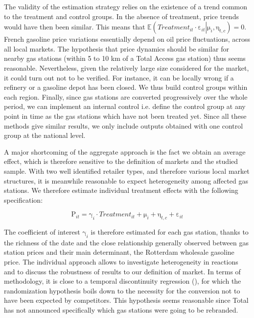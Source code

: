 \documentclass[english]{article}
\begin{document}
The validity of the estimation strategy relies on the existence of a trend common to the treatment and control groups. In the absence of treatment, price trends would have then been similar. This means that
$\mathbb{E}\left(Treatment_{it}\cdot\mathrm{\varepsilon}_{it}\left|\mathrm{\mu}_{i},\mathrm{\eta}_{t,c}\right.\right)=0$. French gasoline price variations essentially depend on oil price fluctuations, across all local markets. The hypothesis that price dynamics should be similar for nearby gas stations (within 5 to 10 km of a Total Access gas station) thus seems reasonable. Nevertheless, given the relatively large size considered for the market, it could turn out not to be verified. For instance, it can be locally wrong if a refinery or a gasoline depot has been closed. We thus build control groups within each region. Finally, since gas stations are converted progressively over the whole period, we can implement an internal control i.e. define the control group at any point in time as the gas stations which have not been treated yet. Since all these methods give similar results, we only include outputs obtained with one control group at the national level.
\medskip{}

A major shortcoming of the aggregate approach is the fact we obtain an average effect, which is therefore sensitive to the definition of markets and the studied sample. With two well identified retailer types, and therefore various local market structures, it is meanwhile reasonable to expect heterogeneity among affected gas stations. We therefore estimate individual treatment effects with the following specification:

\begin{equation}
\mathrm{P}_{it}=\mathrm{\gamma}_{i}\cdot Treatment_{it}+\mathrm{\mu}_{i}+\mathrm{\eta}_{t,c}+\mathrm{\varepsilon}_{it}\label{eq:2}
\end{equation}

\medskip{}

The coefficient of interest $\mathrm{\gamma}_{i}$ is therefore estimated for each gas station, thanks to the richness of the date and the close relationship generally observed between gas station prices and their main determinant, the Rotterdam wholesale gasoline price. The individual approach allows to investigate heterogeneity in reactions and to discuss the robustness of results to our definition of market. In terms of methodology, it is close to a temporal discontinuity regression (\cite{AUF11}), for which the randomization hypothesis boils down to the necessity for the conversion not to have been expected by competitors. This hypothesis seems reasonable since Total has not announced specifically which gas stations were going to be rebranded.\medskip{}
\end{document}
